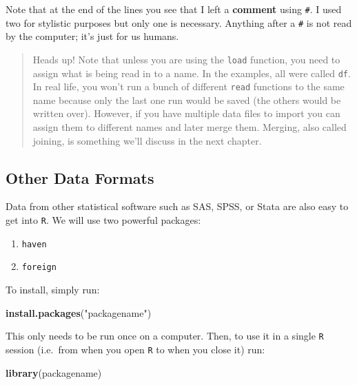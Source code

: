 \documentclass[]{tufte-book}
\newenvironment{Shaded}{}{}
\newcommand{\KeywordTok}[1]{\textcolor[rgb]{0.00,0.44,0.13}{\textbf{#1}}}
\newcommand{\StringTok}[1]{\textcolor[rgb]{0.25,0.44,0.63}{#1}}
\newcommand{\NormalTok}[1]{#1}
\providecommand{\tightlist}{%
  \setlength{\itemsep}{0pt}\setlength{\parskip}{0pt}}
\theoremstyle{definition}
\theoremstyle{definition}
\theoremstyle{remark}
\begin{document}
Note that at the end of the lines you see that I left a \textbf{comment}
using \texttt{\#}. I used two for stylistic purposes but only one is
necessary. Anything after a \texttt{\#} is not read by the computer;
it's just for us humans.

\begin{quote}
Heads up! Note that unless you are using the \texttt{load} function, you
need to assign what is being read in to a name. In the examples, all
were called \texttt{df}. In real life, you won't run a bunch of
different \texttt{read} functions to the same name because only the last
one run would be saved (the others would be written over). However, if
you have multiple data files to import you can assign them to different
names and later merge them. Merging, also called joining, is something
we'll discuss in the next chapter.
\end{quote}

\subsection*{Other Data Formats}\label{other-data-formats}

Data from other statistical software such as SAS, SPSS, or Stata are
also easy to get into \texttt{R}. We will use two powerful packages:

\begin{enumerate}
\def\labelenumi{\arabic{enumi}.}
\tightlist
\item
  \texttt{haven}
\item
  \texttt{foreign}
\end{enumerate}

To install, simply run:

\begin{Shaded}
\begin{Highlighting}[]
\KeywordTok{install.packages}\NormalTok{(}\StringTok{"packagename"}\NormalTok{)}
\end{Highlighting}
\end{Shaded}

This only needs to be run once on a computer. Then, to use it in a
single \texttt{R} session (i.e.~from when you open \texttt{R} to when
you close it) run:

\begin{Shaded}
\begin{Highlighting}[]
\KeywordTok{library}\NormalTok{(packagename)}
\end{Highlighting}
\end{Shaded}
\end{document}
